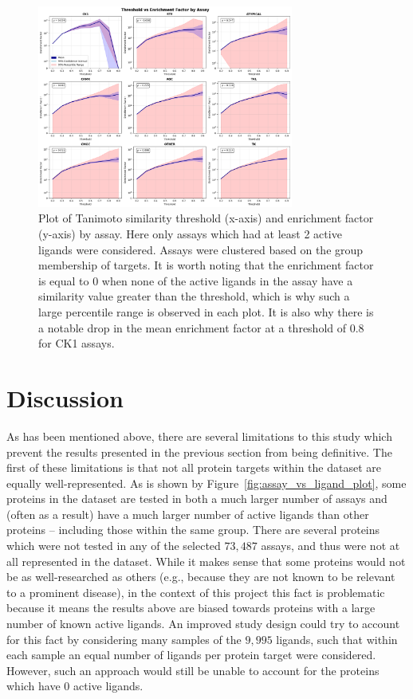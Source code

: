 \documentclass[11pt]{article}
\begin{document}
\begin{figure}[H]
    \centering
    \includegraphics[width=0.75\textwidth]{../figures/enrichment_factor_by_assay.png}
    \caption{Plot of Tanimoto similarity threshold (x-axis) and enrichment factor (y-axis) by assay. Here only assays which had at least 2 active ligands were considered. Assays were clustered based on the group membership of targets. It is worth noting that the enrichment factor is equal to $0$ when none of the active ligands in the assay have a similarity value greater than the threshold, which is why such a large percentile range is observed in each plot. It is also why there is a notable drop in the mean enrichment factor at a threshold of $0.8$ for CK1 assays.}\label{fig:enrichment_by_assay}
\end{figure}

\section{Discussion}\label{sec:discussion}
As has been mentioned above, there are several limitations to this study which prevent the results presented in the previous section from being definitive. 
The first of these limitations is that not all protein targets within the dataset are equally well-represented. 
As is shown by Figure~\ref{fig:assay_vs_ligand_plot}, some proteins in the dataset are tested in both a much larger number of assays and (often as a result) have a much larger number of active ligands than other proteins -- including those within the same group. 
There are several proteins which were not tested in any of the selected $73,487$ assays, and thus were not at all represented in the dataset. 
While it makes sense that some proteins would not be as well-researched as others (e.g., because they are not known to be relevant to a prominent disease), in the context of this project this fact is problematic because it means the results above are biased towards proteins with a large number of known active ligands. 
An improved study design could try to account for this fact by considering many samples of the $9,995$ ligands, such that within each sample an equal number of ligands per protein target were considered. 
However, such an approach would still be unable to account for the proteins which have $0$ active ligands. 
\end{document}
